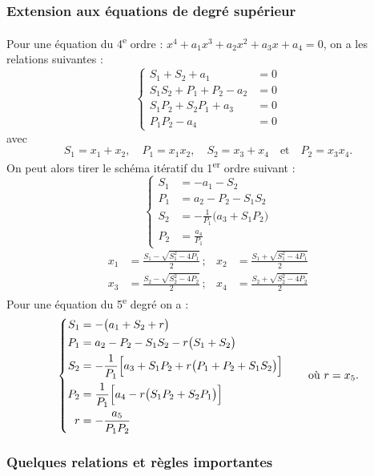 \subsubsection{Extension aux équations de degré supérieur}

Pour une équation du 4\textsuperscript{e} ordre :
$x^4 + a_1x^3 + a_2x^2 + a_3x + a_4 = 0$, on a les relations suivantes :
\[
  \left\{
  \begin{aligned}
    S_1 + S_2 + a_1 &= 0\\
    S_1S_2 + P_1 + P_2 - a_2 &= 0\\
    S_1P_2 + S_2P_1 + a_3 &= 0\\
    P_1P_2 - a_4 &= 0
  \end{aligned}
  \right.
\]
avec
\[
  S_1 = x_1 + x_2, \quad P_1 = x_1x_2, \quad S_2 = x_3 + x_4
  \quad\text{et}\quad P_2 = x_3x_4 .
\]
On peut alors tirer le schéma itératif du 1\textsuperscript{er} ordre
suivant :
\[
  \left\{
  \begin{aligned}
    S_1 &= -a_1 - S_2\\
    P_1 &= a_2 - P_2 - S_1S_2\\
    S_2 &= -\frac{1}{P_1}\bigl(a_3 + S_1P_2\bigr)\\
    P_2 &= \frac{a_4}{P_1}
  \end{aligned}
  \right.
\]
\[
  \begin{aligned}
    x_1 &= \frac{S_1 - \sqrt{S_1^2 - 4P_1}}{2}\,; &
    x_2 &= \frac{S_1 + \sqrt{S_1^2 - 4P_1}}{2}\\[0.4em]
    x_3 &= \frac{S_2 - \sqrt{S_2^2 - 4P_2}}{2}\,; &
    x_4 &= \frac{S_2 + \sqrt{S_2^2 - 4P_2}}{2}
  \end{aligned}
\]
Pour une équation du 5\textsuperscript{e} degré on a :
\[
  \left\{
  \begin{aligned}
    S_1 &= -\bigl(a_1 + S_2 + r\bigr)\\
    P_1 &= a_2 - P_2 - S_1S_2 - r\bigl(S_1 + S_2\bigr)\\
    S_2 &= -\frac{1}{P_1}\Bigl[a_3 + S_1P_2 + r\bigl(P_1 + P_2 + S_1S_2\bigr)\Bigr]\\
    P_2 &= \frac{1}{P_1}\Bigl[a_4 - r\bigl(S_1P_2 + S_2P_1\bigr)\Bigr]\\
    r &= -\frac{a_5}{P_1P_2}
  \end{aligned}
  \right.
  \qquad\text{où } r = x_5 .
\]

\subsubsection{Quelques relations et règles importantes}

